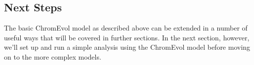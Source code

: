 \subsection{Next Steps}


The basic ChromEvol model as described above can be extended in a number of useful ways 
that will be covered in further sections.
In the next section, however, we'll set up and run a simple \RevBayes analysis using the ChromEvol model
before moving on to the more complex models.


\newpage
